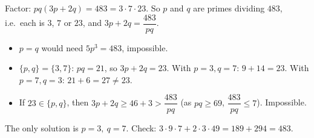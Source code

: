 Factor: $pq(3p+2q)=483=3\cdot7\cdot23$. So $p$ and $q$ are primes dividing $483$, i.e.\ each is $3$, $7$ or $23$, and $3p+2q=\dfrac{483}{pq}$.
\begin{itemize}
\item $p=q$ would need $5p^3=483$, impossible.
\item $\{p,q\}=\{3,7\}$: $pq=21$, so $3p+2q=23$. With $p=3,q=7$: $9+14=23$. With $p=7,q=3$: $21+6=27\ne23$.
\item If $23\in\{p,q\}$, then $3p+2q\ge46+3>\dfrac{483}{pq}$ (as $pq\ge69$, $\dfrac{483}{pq}\le7$). Impossible.
\end{itemize}
The only solution is $\boxed{p=3,\ q=7}$. Check: $3\cdot9\cdot7+2\cdot3\cdot49=189+294=483$.

